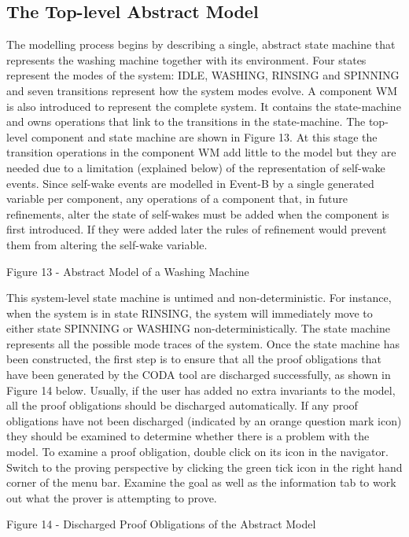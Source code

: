 \subsection{The Top-level Abstract Model}
\label{sec:component_diagrams-tutorial_topLevelAbstractModel}


The modelling process begins by describing a single, abstract state machine that represents the washing machine together with its environment. Four states represent the modes of the system: IDLE, WASHING, RINSING and SPINNING and seven transitions represent how the system modes evolve. A component WM is also introduced to represent the complete system. It contains the state-machine and owns operations that link to the transitions in the state-machine. The top-level component and state machine are shown in Figure 13.
At this stage the transition operations in the component WM add little to the model but they are needed due to a limitation (explained below) of the representation of self-wake events. Since self-wake events are modelled in Event-B by a single generated variable per component, any operations of a component that, in future refinements, alter the state of self-wakes must be added when the component is first introduced. If they were added later the rules of refinement would prevent them from altering the self-wake variable.
 
Figure 13 - Abstract Model of a Washing Machine

This system-level state machine is untimed and non-deterministic. For instance, when the system is in state RINSING, the system will immediately move to either state SPINNING or WASHING non-deterministically. The state machine represents all the possible mode traces of the system.
Once the state machine has been constructed, the first step is to ensure that all the proof obligations that have been generated by the CODA tool are discharged successfully, as shown in Figure 14 below. Usually, if the user has added no extra invariants to the model, all the proof obligations should be discharged automatically. If any proof obligations have not been discharged (indicated by an orange question mark icon) they should be examined to determine whether there is a problem with the model. To examine a proof obligation, double click on its icon in the navigator. Switch to the proving perspective by clicking the green tick icon in the right hand corner of the menu bar.  Examine the goal as well as the information tab to work out what the prover is attempting to prove.
 
Figure 14 - Discharged Proof Obligations of the Abstract Model

